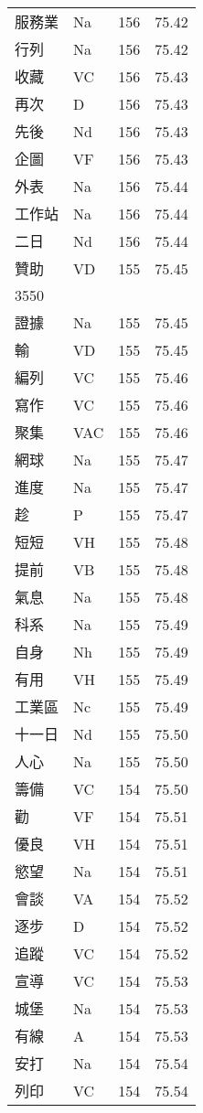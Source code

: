 \documentclass[twocolumn]{book}
\begin{document}
\begin{supertabular}{llrr}
服務業 & Na & 156 &  75.42\\
行列 & Na & 156 &  75.42\\
收藏 & VC & 156 &  75.43\\
再次 & D & 156 &  75.43\\
先後 & Nd & 156 &  75.43\\
企圖 & VF & 156 &  75.43\\
外表 & Na & 156 &  75.44\\
工作站 & Na & 156 &  75.44\\
二日 & Nd & 156 &  75.44\\
贊助 & VD & 155 &  75.45\\
3550\\
證據 & Na & 155 &  75.45\\
輸 & VD & 155 &  75.45\\
編列 & VC & 155 &  75.46\\
寫作 & VC & 155 &  75.46\\
聚集 & VAC & 155 &  75.46\\
網球 & Na & 155 &  75.47\\
進度 & Na & 155 &  75.47\\
趁 & P & 155 &  75.47\\
短短 & VH & 155 &  75.48\\
提前 & VB & 155 &  75.48\\
氣息 & Na & 155 &  75.48\\
科系 & Na & 155 &  75.49\\
自身 & Nh & 155 &  75.49\\
有用 & VH & 155 &  75.49\\
工業區 & Nc & 155 &  75.49\\
十一日 & Nd & 155 &  75.50\\
人心 & Na & 155 &  75.50\\
籌備 & VC & 154 &  75.50\\
勸 & VF & 154 &  75.51\\
優良 & VH & 154 &  75.51\\
慾望 & Na & 154 &  75.51\\
會談 & VA & 154 &  75.52\\
逐步 & D & 154 &  75.52\\
追蹤 & VC & 154 &  75.52\\
宣導 & VC & 154 &  75.53\\
城堡 & Na & 154 &  75.53\\
有線 & A & 154 &  75.53\\
安打 & Na & 154 &  75.54\\
列印 & VC & 154 &  75.54\\

\end{supertabular}
\end{document}
